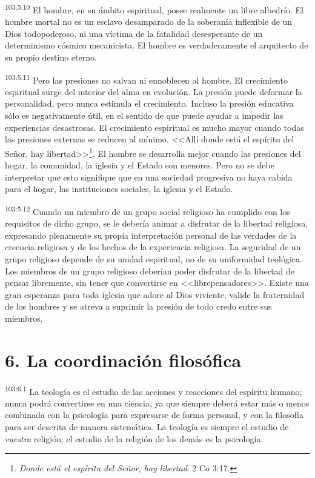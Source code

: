 \par
\textsuperscript{103:5.10} El hombre, en su ámbito espiritual, posee realmente un libre albedrío. El hombre mortal no es un esclavo desamparado de la soberanía inflexible de un Dios todopoderoso, ni una víctima de la fatalidad desesperante de un determinismo cósmico mecanicista. El hombre es verdaderamente el arquitecto de su propio destino eterno.

\par
\textsuperscript{103:5.11} Pero las presiones no salvan ni ennoblecen al hombre. El crecimiento espiritual surge del interior del alma en evolución. La presión puede deformar la personalidad, pero nunca estimula el crecimiento. Incluso la presión educativa sólo es negativamente útil, en el sentido de que puede ayudar a impedir las experiencias desastrosas. El crecimiento espiritual es mucho mayor cuando todas las presiones externas se reducen al mínimo. <<Allí donde está el espíritu del Señor, hay libertad>>\footnote{\textit{Donde está el espíritu del Señor, hay libertad}: 2 Co 3:17.}. El hombre se desarrolla mejor cuando las presiones del hogar, la comunidad, la iglesia y el Estado son menores. Pero no se debe interpretar que esto signifique que en una sociedad progresiva no haya cabida para el hogar, las instituciones sociales, la iglesia y el Estado.

\par
\textsuperscript{103:5.12} Cuando un miembro de un grupo social religioso ha cumplido con los requisitos de dicho grupo, se le debería animar a disfrutar de la libertad religiosa, expresando plenamente su propia interpretación personal de las verdades de la creencia religiosa y de los hechos de la experiencia religiosa. La seguridad de un grupo religioso depende de su unidad espiritual, no de su uniformidad teológica. Los miembros de un grupo religioso deberían poder disfrutar de la libertad de pensar libremente, sin tener que convertirse en <<librepensadores>>. Existe una gran esperanza para toda iglesia que adore al Dios viviente, valide la fraternidad de los hombres y se atreva a suprimir la presión de todo credo entre sus miembros.

\section*{6. La coordinación filosófica}
\par
\textsuperscript{103:6.1} La teología es el estudio de las acciones y reacciones del espíritu humano; nunca podrá convertirse en una ciencia, ya que siempre deberá estar más o menos combinada con la psicología para expresarse de forma personal, y con la filosofía para ser descrita de manera sistemática. La teología es siempre el estudio de \textit{vuestra} religión; el estudio de la religión de los demás es la psicología.

